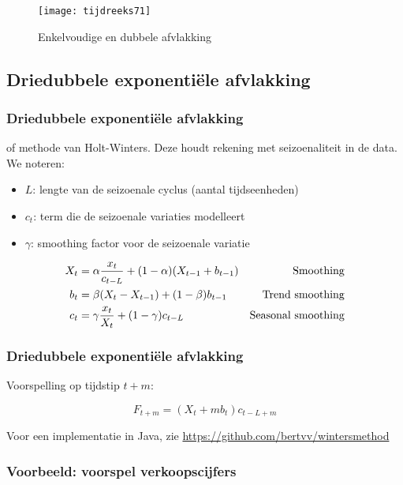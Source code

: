 \documentclass[aspectratio=169]{beamer}
\begin{document}
\begin{frame}
  \begin{figure}
    \centering
    \texttt{[image: tijdreeks71]}
    \caption{Enkelvoudige en dubbele afvlakking}
    \label{fig:tijdreeks71}
  \end{figure}
\end{frame}

\subsection{Driedubbele exponentiële afvlakking}

\begin{frame}
  \frametitle{Driedubbele exponentiële afvlakking}
  
  of methode van Holt-Winters. Deze houdt rekening met seizoenaliteit in de data. We noteren:
  
  \begin{itemize}
    \item $L$: lengte van de seizoenale cyclus (aantal tijdseenheden)
    \item $c_t$: term die de seizoenale variaties modelleert
    \item $\gamma$: smoothing factor voor de seizoenale variatie
  \end{itemize}
  
  \begin{align*}
  X_{t} &= \alpha \frac{x_{t}}{c_{t-L}} + (1-\alpha) (X_{t-1} + b_{t-1}) & \textnormal{Smoothing}\\
  b_{t} &= \beta (X_{t} - X_{t-1}) + (1-\beta)b_{t-1} & \textnormal{Trend smoothing} \\
  c_{t} &= \gamma \frac{x_{t}}{X_{t}} + (1-\gamma)c_{t-L} & \textnormal{Seasonal smoothing} \\
  \label{eq:HoltWinters}
  \end{align*}
  
\end{frame}

\begin{frame}
  \frametitle{Driedubbele exponentiële afvlakking}
  
  Voorspelling op tijdstip $t + m$:
  
  \[ F_{t+m} = (X_{t} + mb_{t})c_{t-L+m} \]
  
  Voor een implementatie in Java, zie \url{https://github.com/bertvv/wintersmethod}
\end{frame}

\begin{frame}
  \frametitle{Voorbeeld: voorspel verkoopscijfers}
  
  \centering
\end{frame}
\end{document}
